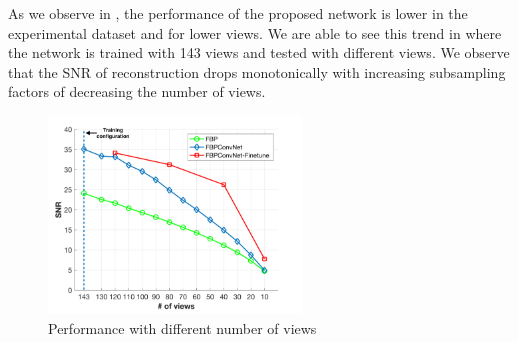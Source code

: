 \documentclass[journal, onecolumn, 11pt]{IEEEtran}
\begin{document}
\begin{table}[h]
\caption{\label{tab:res1}Results for Biomedical Dataset}
\end{table}

\begin{table}[h]
    \caption{\label{tab:res2}Results for Experimental Dataset}
    \end{table}
    
As we observe in , the performance of the proposed network is lower in the experimental dataset and for lower views. We are able to see this trend in  where the network is trained with 143 views and tested with different views. We observe that the SNR of reconstruction drops monotonically with increasing subsampling factors of decreasing the number of views. 

\begin{figure}[h]
\centering
\includegraphics[width=0.6\textwidth]{images/viewscompare.png}
\caption{Performance with different number of views}\label{fig:compareview}
\end{figure}
\end{document}
